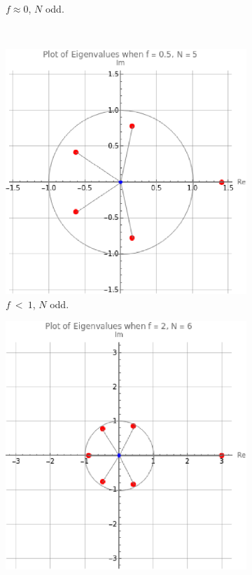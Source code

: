 \documentclass[11pt,reqno]{amsart}
\numberwithin{equation}{section}
\theoremstyle{plain}
\begin{document}
\begin{figure}[h]
\begin{subfigure}[b]{0.45\textwidth}
        \caption{$f \approx 0$, $N$ odd.}%
        \label{fig:fig2}
    \end{subfigure}
    \\
    \begin{subfigure}[b]{0.45\textwidth}
        \includegraphics[width=\textwidth]{fHfN5.eps}
        \caption{$f \ < \ 1$, $N$ odd.}
        \label{fig:fig3}
    \end{subfigure}
    \hfill
    \begin{subfigure}[b]{0.45\textwidth}
        \includegraphics[width=\textwidth]{f2N6.eps}

\end{subfigure}
\end{figure}
\end{document}
